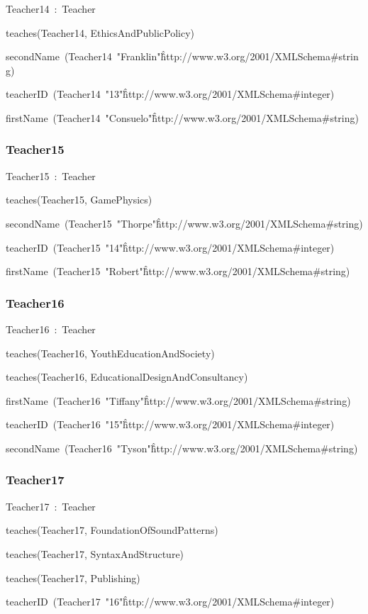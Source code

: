 \documentclass{article}
\begin{document}
Teacher14~:~Teacher

teaches(Teacher14, EthicsAndPublicPolicy)

secondName~(Teacher14~"Franklin"\^\^http://www.w3.org/2001/XMLSchema#string)

teacherID~(Teacher14~"13"\^\^http://www.w3.org/2001/XMLSchema#integer)

firstName~(Teacher14~"Consuelo"\^\^http://www.w3.org/2001/XMLSchema#string)

\subsubsection*{Teacher15}

Teacher15~:~Teacher

teaches(Teacher15, GamePhysics)

secondName~(Teacher15~"Thorpe"\^\^http://www.w3.org/2001/XMLSchema#string)

teacherID~(Teacher15~"14"\^\^http://www.w3.org/2001/XMLSchema#integer)

firstName~(Teacher15~"Robert"\^\^http://www.w3.org/2001/XMLSchema#string)

\subsubsection*{Teacher16}

Teacher16~:~Teacher

teaches(Teacher16, YouthEducationAndSociety)

teaches(Teacher16, EducationalDesignAndConsultancy)

firstName~(Teacher16~"Tiffany"\^\^http://www.w3.org/2001/XMLSchema#string)

teacherID~(Teacher16~"15"\^\^http://www.w3.org/2001/XMLSchema#integer)

secondName~(Teacher16~"Tyson"\^\^http://www.w3.org/2001/XMLSchema#string)

\subsubsection*{Teacher17}

Teacher17~:~Teacher

teaches(Teacher17, FoundationOfSoundPatterns)

teaches(Teacher17, SyntaxAndStructure)

teaches(Teacher17, Publishing)

teacherID~(Teacher17~"16"\^\^http://www.w3.org/2001/XMLSchema#integer)
\end{document}
